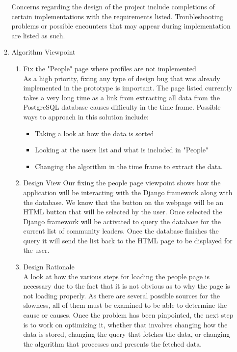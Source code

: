 \documentclass[draftclsnofoot,10pt,onecolumn]{IEEEtran} %
\begin{document}
\begin{enumerate}
\begin{enumerate}
		Concerns regarding the design of the project include completions of certain implementations with the requirements
		listed. Troubleshooting problems or possible encounters that may appear during implementation are listed as such.\\
		
		\item Algorithm Viewpoint \\
			\begin{enumerate}
				\item Fix the "People" page where profiles are not implemented \\
				As a high priority, fixing any type of design bug that was already implemented in the prototype is
				important. The page listed currently takes a very long time as a link from extracting all data from the
				PostgreSQL database causes difficulty in the time frame. Possible ways to approach in this solution
				include:
				\begin{itemize}
					\item Taking a look at how the data is sorted
					\item Looking at the users list and what is included in "People"
					\item Changing the algorithm in the time frame to extract the data.\\
				\end{itemize}
				
				\item Design View %
				Our fixing the people page viewpoint shows how the application will be interacting with the Django
				framework along with the database. We know that the button on the webpage will be an HTML button that
				will be selected by the user. Once selected the Django framework will be activated to query the database
				for the current list of community leaders. Once the database finishes the query it will send the list back to
				the HTML page to be displayed for the user.\\
				
				\item Design Rationale \\
				A look at how the various steps for loading the people page is necessary due to the fact that it is not
				obvious as to why the page is not loading properly. As there are several possible sources for the slowness,
				all of them must be examined to be able to determine the cause or causes. Once the problem has been
				pinpointed, the next step is to work on optimizing it, whether that involves changing how the data is stored,
				changing the query that fetches the data, or changing the algorithm that processes and presents the fetched
				data.\\
				

\end{enumerate}
\end{enumerate}
\end{enumerate}
\end{document}
